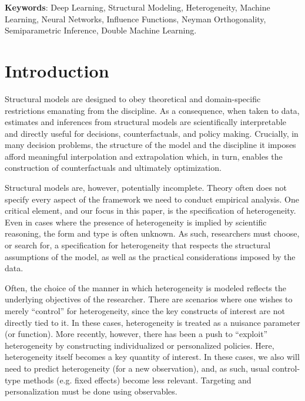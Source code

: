 \documentclass[12pt]{article}
\numberwithin{equation}{section}
\theoremstyle{definition}
\begin{document}
\bigskip


\textbf{Keywords}: Deep Learning, Structural Modeling, Heterogeneity, Machine Learning, Neural Networks, Influence Functions, Neyman Orthogonality, Semiparametric Inference, Double Machine Learning.

\setcounter{page}{0}
\thispagestyle{empty}



\newpage
\doublespacing
{}


\section{Introduction}
	\label{sec:intro}


Structural models are designed to obey theoretical and domain-specific restrictions emanating from the discipline. As a consequence, when taken to data, estimates and inferences from structural models are scientifically interpretable and directly useful for decisions, counterfactuals, and policy making. Crucially, in many decision problems, the structure of the model and the discipline it imposes afford meaningful interpolation and extrapolation which, in turn, enables the construction of counterfactuals and ultimately optimization. 

Structural models are, however, potentially incomplete. Theory often does not specify every aspect of the framework we need to conduct empirical analysis. One critical element, and our focus in this paper, is the specification of heterogeneity. Even in cases where the presence of heterogeneity is implied by scientific reasoning, the form and type is often unknown. As such, researchers must choose, or search for, a specification for heterogeneity that respects the structural assumptions of the model, as well as the practical considerations imposed by the data. 

Often, the choice of the manner in which heterogeneity is modeled reflects the underlying objectives of the researcher. There are scenarios where one wishes to merely ``control'' for heterogeneity, since the key constructs of interest are not directly tied to it. In these cases, heterogeneity is treated as a nuisance parameter (or function). More recently, however, there has been a push to ``exploit'' heterogeneity by constructing individualized or personalized policies. Here, heterogeneity itself becomes a key quantity of interest. In these cases, we also will need to predict heterogeneity (for a new observation), and, as such, usual control-type methods (e.g. fixed effects) become less relevant. Targeting and personalization must be done using observables.
\end{document}
